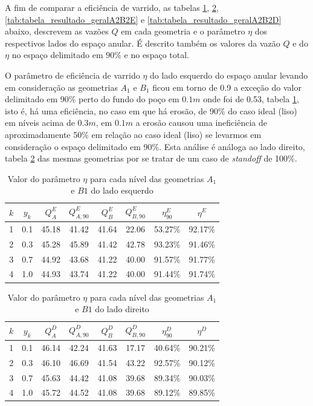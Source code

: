 A fim de comparar a eficiência de varrido, as tabelas \ref{tab:tabela_resultado_geralA1B1E}, \ref{tab:tabela_resultado_geralA1B1D}, \ref{tab:tabela_resultado_geralA2B2E} e  \ref{tab:tabela_resultado_geralA2B2D} abaixo, descrevem as vazões $Q$ em cada geometria e o parâmetro $\eta$ dos respectivos lados do espaço anular. É descrito também os valores da vazão $Q$ e do $\eta$ no espaço delimitado em $90\%$ e no espaço total. 
    
O parâmetro de eficiência de varrido $\eta$ do lado esquerdo do espaço anular levando em consideração as geometrias $A_1$ e $B_1$ ficou em torno de 0.9 a exceção do valor delimitado em 90\% perto do fundo do poço em $0.1m$ onde foi de 0.53, tabela \ref{tab:tabela_resultado_geralA1B1E}, isto é, há uma eficiência, no caso em que há erosão, de 90\% do caso ideal (liso) em níveis acima de $0.3m$, em $0.1m$ a erosão causou uma ineficiência de aproximadamente 50\% em relação ao caso ideal (liso) se levarmos em consideração o espaço delimitado em 90\%. Esta análise é análoga ao lado direito, tabela \ref{tab:tabela_resultado_geralA1B1D} das mesmas geometrias por se tratar de um caso de \textit{standoff} de 100\%.  
    
    \begin{table}[H]
        \centering
        \caption{Valor do parâmetro $\eta$ para cada nível das geometrias $A_1$ e $B1$ do lado esquerdo}
    	\begin{tabular}{cccccccc}
    		\hline
    		$k$ & $y_k$ & $Q_A^E$ & $Q_{A,90}^E$ & $Q_B^E$ & $Q_{B,90}^E$ & $\eta_{90}^E$ & $\eta^E$ \\
    		\hline
    		1 & 0.1 & 45.18 & 41.42 & 41.64 & 22.06 & 53.27\% & 92.17\% \\
    		2 & 0.3 & 45.28 & 45.89 & 41.42 & 42.78 & 93.23\% & 91.46\% \\
    		3 & 0.7 & 44.92 & 43.68 & 41.22 & 40.00 & 91.57\% & 91.77\% \\
    		4 & 1.0 & 44.93 & 43.74 & 41.22 & 40.00 & 91.44\% & 91.74\% \\
    		\hline
    	\end{tabular}
    	\label{tab:tabela_resultado_geralA1B1E}
    \end{table}
    
    \begin{table}[H]
        \centering
        \caption{Valor do parâmetro $\eta$ para cada nível das geometrias $A_1$ e $B1$ do lado direito}
    	\begin{tabular}{cccccccc}
    		\hline
    		$k$ & $y_k$ & $Q_A^D$ & $Q_{A,90}^D$ & $Q_B^D$ & $Q_{B,90}^D$ & $\eta_{90}^D$ & $\eta^D$ \\
    		\hline
    		1 & 0.1 & 46.14 & 42.24 & 41.63 & 17.17 & 40.64\% & 90.21\% \\
    		2 & 0.3 & 46.10 & 46.69 & 41.54 & 43.22 & 92.57\% & 90.12\% \\
    		3 & 0.7 & 45.63 & 44.42 & 41.08 & 39.68 & 89.34\% & 90.03\% \\
    		4 & 1.0 & 45.72 & 44.52 & 41.08 & 39.68 & 89.12\% & 89.85\% \\
    		\hline
    	\end{tabular}
    	\label{tab:tabela_resultado_geralA1B1D}
    \end{table}
    
